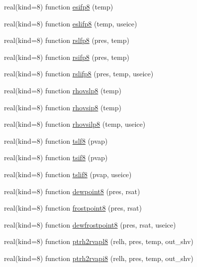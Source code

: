 \begin{DoxyCompactItemize}
\item 
real(kind=8) function \hyperlink{namespacetherm__lib8_a73a640719683dd2b05aba5a87822aa22}{esifp8} (temp)
\item 
real(kind=8) function \hyperlink{namespacetherm__lib8_ae0d53f4e0871d19461d34b59cc932516}{eslifp8} (temp, useice)
\item 
real(kind=8) function \hyperlink{namespacetherm__lib8_a73403657254241b151da2ab205ab477f}{rslfp8} (pres, temp)
\item 
real(kind=8) function \hyperlink{namespacetherm__lib8_ad59e6dc4fe8995e92cdae7dd3a340efc}{rsifp8} (pres, temp)
\item 
real(kind=8) function \hyperlink{namespacetherm__lib8_ab015aacbfd2ec939e27197d7477f09a7}{rslifp8} (pres, temp, useice)
\item 
real(kind=8) function \hyperlink{namespacetherm__lib8_a8f1e9b7f94a457d1972dc10825caefe3}{rhovslp8} (temp)
\item 
real(kind=8) function \hyperlink{namespacetherm__lib8_a9ad0dba1a5ff870a6a36cd06835e8e15}{rhovsip8} (temp)
\item 
real(kind=8) function \hyperlink{namespacetherm__lib8_a3700047f1dd386e992cb13e626018656}{rhovsilp8} (temp, useice)
\item 
real(kind=8) function \hyperlink{namespacetherm__lib8_ad5b9924474672841007e9b1542a87b4e}{tslf8} (pvap)
\item 
real(kind=8) function \hyperlink{namespacetherm__lib8_a80b5a2ebc2ce135a214004173c06cb4e}{tsif8} (pvap)
\item 
real(kind=8) function \hyperlink{namespacetherm__lib8_ada59a10b18f64fb7eba657201813da06}{tslif8} (pvap, useice)
\item 
real(kind=8) function \hyperlink{namespacetherm__lib8_a0d84f87a60357ce93e4c39dde6795068}{dewpoint8} (pres, rsat)
\item 
real(kind=8) function \hyperlink{namespacetherm__lib8_a137ef754961bd0772247f311c22e160f}{frostpoint8} (pres, rsat)
\item 
real(kind=8) function \hyperlink{namespacetherm__lib8_a028fa9eb09650fbaa2b7c0b6b8a2fd8c}{dewfrostpoint8} (pres, rsat, useice)
\item 
real(kind=8) function \hyperlink{namespacetherm__lib8_a1369aae8fe00b751c008902b167f212b}{ptrh2rvapl8} (relh, pres, temp, out\+\_\+shv)
\item 
real(kind=8) function \hyperlink{namespacetherm__lib8_a7cf8c625372462c063600af8050c6639}{ptrh2rvapi8} (relh, pres, temp, out\+\_\+shv)
\item 

\end{DoxyCompactItemize}
